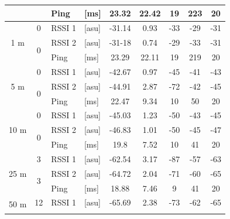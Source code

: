 \begin{table}[H]
\begin{tabular}{|c|c|l|l|c|c|c|c|c|}
        && Ping & [ms] & 23.32 & 22.42 & 19 & 223 & 20 \\\hline\hline
        \multirow{3}{*}{1 m} & \multirow{1}{*}{0} & RSSI 1 & [asu] & -31.14 & 0.93 & -33 & -29 & -31 \\\cline{2-9}\cline{2-9}
        & \multirow{2}{*}{0} & RSSI 2 & [asu] & -31-18 & 0.74 & -29 & -33 & -31 \\\cline{3-9}
        && Ping & [ms] & 23.29 & 22.11 & 19 & 219 & 20 \\\hline\hline
        \multirow{3}{*}{5 m} & \multirow{1}{*}{0} & RSSI 1 & [asu] & -42.67 & 0.97 & -45 & -41 & -43 \\\cline{2-9}\cline{2-9}
        & \multirow{2}{*}{0} & RSSI 2 & [asu] & -44.91 & 2.87 & -72 & -42 & -45 \\\cline{3-9}
        && Ping & [ms] & 22.47 & 9.34 & 10 & 50 & 20 \\\hline\hline
        \multirow{3}{*}{10 m} & \multirow{1}{*}{0} & RSSI 1 & [asu] & -45.03 & 1.23 & -50 & -43 & -45 \\\cline{2-9}\cline{2-9}
        & \multirow{2}{*}{0} & RSSI 2 & [asu] & -46.83 & 1.01 & -50 & -45 & -47 \\\cline{3-9}
        && Ping & [ms] & 19.8 & 7.52 & 10 & 41 & 20 \\\hline\hline
        \multirow{3}{*}{25 m} & \multirow{1}{*}{3} & RSSI 1 & [asu] & -62.54 & 3.17 & -87 & -57 & -63 \\\cline{2-9}\cline{2-9}
        & \multirow{2}{*}{3} & RSSI 2 & [asu] & -64.72 & 2.04 & -71 & -60 & -65 \\\cline{3-9}
        && Ping & [ms] & 18.88 & 7.46 & 9 & 41 & 20 \\\hline\hline
        \multirow{3}{*}{50 m} & \multirow{1}{*}{12} & RSSI 1 & [asu] & -65.69 & 2.38 & -73 & -62 & -65 \\\cline{2-9}\cline{2-9}

\end{tabular}
\end{table}
